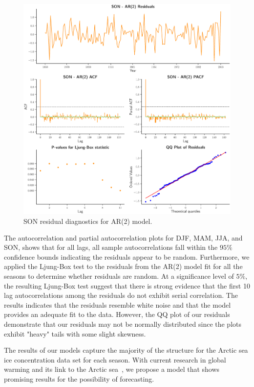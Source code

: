 \documentclass[12pt]{article}
\begin{document}
\begin{figure}[H]
  \centering
  \includegraphics[width=1\textwidth,center]{figs/son_res}
  \caption{SON residual diagnostics for AR(2) model.}\label{son_res}
\end{figure}

The autocorrelation and partial autocorrelation plots for DJF, MAM, JJA, and SON, shows that for all lags, all sample autocorrelations fall within the $95\%$ confidence bounds indicating the residuals appear to be random. Furthermore, we applied the Ljung-Box test to the residuals from the AR(2) model fit for all the seasons to determine whether residuals are random. At a significance level of $5\%$, the resulting Ljung-Box test suggest that there is strong evidence that the first 10 lag autocorrelations among the residuals do not exhibit serial correlation. The results indicates that the residuals resemble white noise and that the model provides an adequate fit to the data. However, the QQ plot of our residuals demonstrate that our residuals may not be normally distributed since the plots exhibit "heavy" tails with some slight skewness.

The results of our models capture the majority of the structure for the Arctic sea ice concentration data set for each season. With current research in global warming and its link to the Arctic sea~\citep{pithan}, we propose a model that shows promising results for the possibility of forecasting. 
\end{document}
